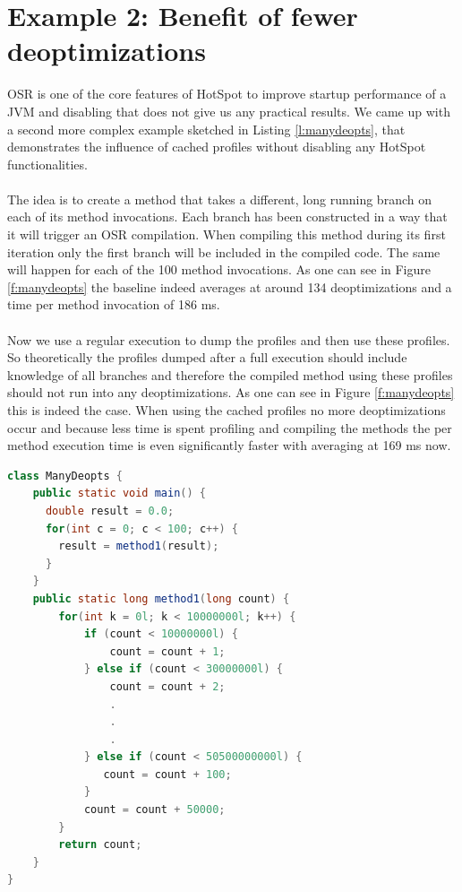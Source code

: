 \section{Example 2: Benefit of fewer deoptimizations}
\label{s:ex2}
OSR is one of the core features of HotSpot to improve startup performance of a JVM and disabling that does not give us any practical results. We came up with a second more complex example sketched in Listing \ref{l:manydeopts}, that demonstrates the influence of cached profiles without disabling any HotSpot functionalities.
\\\\
The idea is to create a method that takes a different, long running branch on each of its method invocations. Each branch has been constructed in a way that it will trigger an OSR compilation. When compiling this method during its first iteration only the first branch will be included in the compiled code. The same will happen for each of the 100 method invocations. As one can see in Figure \ref{f:manydeopts} the baseline indeed averages at around 134 deoptimizations and a time per method invocation of 186 ms.
\\\\
Now we use a regular execution to dump the profiles and then use these profiles. So theoretically the profiles dumped after a full execution should include knowledge of all branches and therefore the compiled method using these profiles should not run into any deoptimizations. As one can see in Figure \ref{f:manydeopts} this is indeed the case. When using the cached profiles no more deoptimizations occur and because less time is spent profiling and compiling the methods the per method execution time is even significantly faster with averaging at 169 ms now.
\begin{lstlisting}[float,caption=Simple method that causes many deoptimizations,label=l:manydeopts,language=Java]
class ManyDeopts {
    public static void main() {
      double result = 0.0;
      for(int c = 0; c < 100; c++) {
        result = method1(result);
      }
    }
    public static long method1(long count) {
        for(int k = 0l; k < 10000000l; k++) {
            if (count < 10000000l) {
                count = count + 1;
            } else if (count < 30000000l) {
                count = count + 2;
                .
                .
                .
            } else if (count < 50500000000l) {
               count = count + 100;
            }
            count = count + 50000;
        }
        return count;
    }
}
\end{lstlisting}

